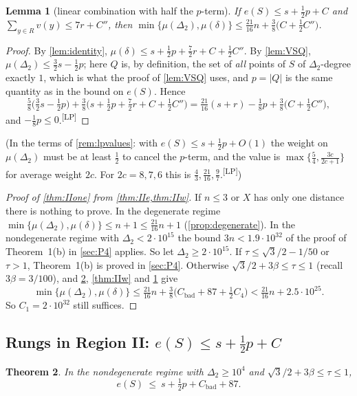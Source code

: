 \documentclass[11pt]{amsart}
\newtheorem{theorem}{Theorem}[section]
\newtheorem{lemma}[theorem]{Lemma}
\theoremstyle{definition}
\theoremstyle{remark}
\newcommand{\Dt}{\Delta_2}
\newcommand{\mult}{\mu}
\newcommand{\chk}[1]{\textsuperscript{[#1]}}
\begin{document}
\begin{lemma}[linear combination with half the $p$-term]\label{lem:IIlp}
If $e(S)\le s+\frac12p+C$ and $\sum_{y\in R}v(y)\le7r+C''$, then $\min\{\mult(\Dt),\mult(\delta)\}\le\frac{21}{16}n+\frac38\bigl(C+\frac12C''\bigr)$.
\end{lemma}
\begin{proof}
By \cref{lem:identity}, $\mult(\delta)\le s+\frac12p+\frac72r+C+\frac12C''$. By \cref{lem:VSQ}, $\mult(\Dt)\le\frac32s-\frac12p$; here $Q$ is, by definition, the set of \emph{all} points of $S$ of $\Dt$-degree exactly $1$, which is what the proof of \cref{lem:VSQ} uses, and $p=|Q|$ is the same quantity as in the bound on $e(S)$. Hence
\[
\tfrac58\bigl(\tfrac32s-\tfrac12p\bigr)+\tfrac38\bigl(s+\tfrac12p+\tfrac72r+C+\tfrac12C''\bigr)=\tfrac{21}{16}(s+r)-\tfrac18p+\tfrac38\bigl(C+\tfrac12C''\bigr),
\]
and $-\frac18p\le0$.\chk{LP}
\end{proof}
(In the terms of \cref{rem:lpvalues}: with $e(S)\le s+\frac12p+O(1)$ the weight on $\mult(\Dt)$ must be at least $\frac12$ to cancel the $p$-term, and the value is $\max\{\frac54,\frac{3c}{2c+1}\}$ for average weight $2c$. For $2c=8,7,6$ this is $\frac43,\frac{21}{16},\frac97$.\chk{LP})

\begin{proof}[Proof of \cref{thm:IIone} from \cref{thm:IIe,thm:IIw}]
If $n\le3$ or $X$ has only one distance there is nothing to prove. In the degenerate regime $\min\{\mult(\Dt),\mult(\delta)\}\le n+1\le\frac{21}{16}n+1$ (\cref{prop:degenerate}). In the nondegenerate regime with $\Dt<2\cdot10^{15}$ the bound $3n<1.9\cdot10^{32}$ of the proof of Theorem~1(b) in \cref{sec:P4} applies. So let $\Dt\ge2\cdot10^{15}$. If $\tau\le\sqrt3/2-1/50$ or $\tau>1$, Theorem~1(b) is proved in \cref{sec:P4}. Otherwise $\sqrt3/2+3\beta\le\tau\le1$ (recall $3\beta=3/100$), and \cref{thm:IIe}, \cref{thm:IIw} and \cref{lem:IIlp} give
\[
\min\{\mult(\Dt),\mult(\delta)\}\le\tfrac{21}{16}n+\tfrac38\bigl(C_{\mathrm{bad}}+87+\tfrac12C_4\bigr)<\tfrac{21}{16}n+2.5\cdot10^{25}.
\]
So $C_1=2\cdot10^{32}$ still suffices.
\end{proof}

\subsection{Rungs in Region II: \texorpdfstring{$e(S)\le s+\frac12p+C$}{e(S) <= s + p/2 + C}}\label{sec:IIe}

\begin{theorem}\label{thm:IIe}
In the nondegenerate regime with $\Dt\ge10^4$ and $\sqrt3/2+3\beta\le\tau\le1$,
\[
e(S)\ \le\ s+\tfrac12p+C_{\mathrm{bad}}+87 .
\]
\end{theorem}
\end{document}
